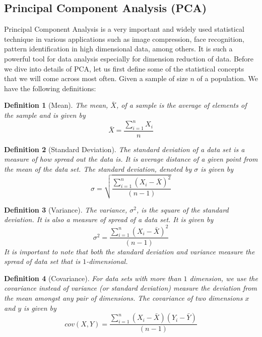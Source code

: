 \documentclass[10pt,a4paper]{article}
\newtheorem{defn}{Definition}
\begin{document}
     \subsection{Principal Component Analysis (PCA)}
	  Principal Component Analysis is a very important and widely used statistical technique in various applications such as image compression, face recognition, pattern identification in high dimensional data, among others. It is such a powerful tool for data analysis especially for dimension reduction of data. Before we dive into details of PCA, let us first define some of the statistical concepts that we will come across most often. Given a sample of size $n$ of a population. We have the following definitions:
	  
	  \begin{defn}[Mean]
	  	The mean, $\bar{X}$, of a sample is the average of elements of the sample and is given by
	  	\begin{equation}
	  	\bar{X} = \frac{\sum_{i=1}^{n} X_i}{n}
	  	\end{equation}
	  \end{defn}
    
      \begin{defn}[Standard Deviation]
      	The standard deviation of a data set is a measure of how spread out the data is. It is average distance of a given point from the mean of the data set. The standard deviation, denoted by $\sigma$ is given by
      	\begin{equation}
      	\sigma = \sqrt{\frac{\sum_{i=1}^{n} (X_i - \bar{X})^2}{(n-1)}}
      	\end{equation}
      \end{defn}
  
      \begin{defn}[Variance]
      	The variance, $\sigma^2$, is the square of the standard deviation. It is also a measure of spread of a data set. It is given by
      	\begin{equation}
      	\sigma^2 =  \frac{\sum_{i=1}^{n} (X_i - \bar{X})^2}{(n-1)}
      	\end{equation}
      	It is important to note that both the standard deviation and variance measure the spread of data set that is $1$-dimensional. 
      \end{defn}
  
      \begin{defn}[Covariance]
      	For data sets with more than $1$ dimension, we use the covariance instead of variance (or standard deviation) measure the deviation from the mean amongst any pair of dimensions. The covariance of two dimensions $x$ and $y$ is given by
      	\begin{equation}
      	cov(X,Y) = \frac{\sum_{i=1}^{n} (X_i - \bar{X}) (Y_i - \bar{Y})}{(n-1)}
      	\end{equation}
      \end{defn}
  
\end{document}
